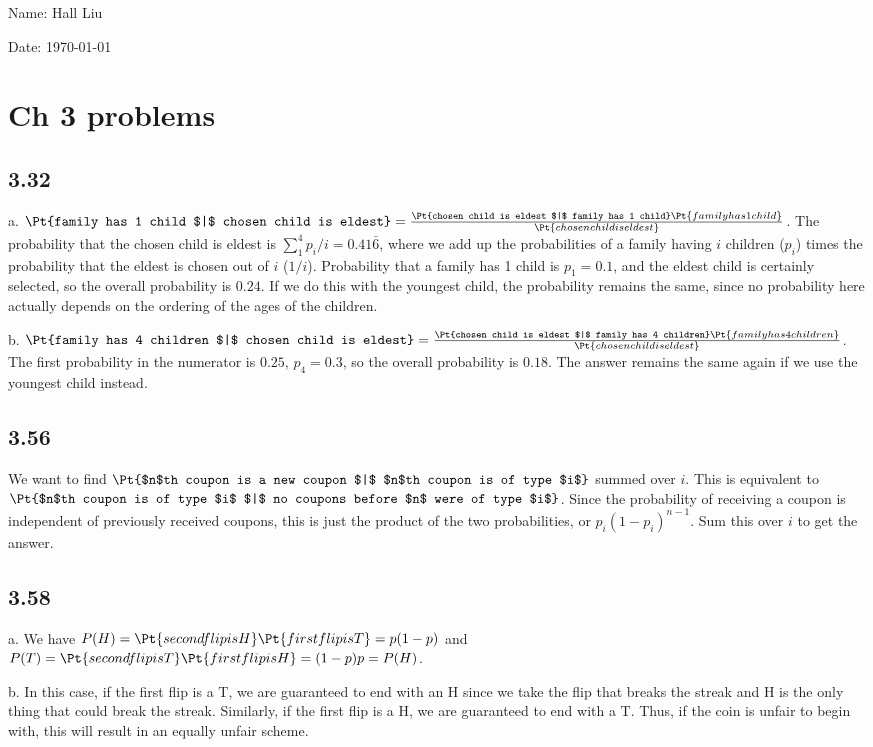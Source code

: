 \documentclass{article}
\begin{document}
Name: Hall Liu

Date: \today 
\vspace{1.5cm}
\section*{Ch 3 problems}
\subsection*{3.32}
a. $\Pt{family has 1 child $|$ chosen child is eldest} = \frac{\Pt{chosen child is eldest $|$ family has 1 child}\Pt{family has 1 child}}{\Pt{chosen child is eldest}}$. The probability that the chosen child is eldest is $\sum_1^4 p_i/i=0.41\bar{6}$, where we add up the probabilities of a family having $i$ children ($p_i$) times the probability that the eldest is chosen out of $i$ ($1/i$). Probability that a family has 1 child is $p_1=0.1$, and the eldest child is certainly selected, so the overall probability is $0.24$. If we do this with the youngest child, the probability remains the same, since no probability here actually depends on the ordering of the ages of the children.

b. $\Pt{family has 4 children $|$ chosen child is eldest} = \frac{\Pt{chosen child is eldest $|$ family has 4 children}\Pt{family has 4 children}}{\Pt{chosen child is eldest}}$. The first probability in the numerator is $0.25$, $p_4=0.3$, so the overall probability is $0.18$. The answer remains the same again if we use the youngest child instead.
\subsection*{3.56}
We want to find $\Pt{$n$th coupon is a new coupon $|$ $n$th coupon is of type $i$}$ summed over $i$. This is equivalent to \\
$\Pt{$n$th coupon is of type $i$ $|$ no coupons before $n$ were of type $i$}$. Since the probability of receiving a coupon is independent of previously received coupons, this is just the product of the two probabilities, or $p_i(1-p_i)^{n-1}$. Sum this over $i$ to get the answer.
\subsection*{3.58}
a. We have $P(H)=\Pt{second flip is H}\Pt{first flip is T}=p(1-p)$ and $P(T)=\Pt{second flip is T}\Pt{first flip is H}=(1-p)p=P(H)$.

b. In this case, if the first flip is a T, we are guaranteed to end with an H since we take the flip that breaks the streak and H is the only thing that could break the streak. Similarly, if the first flip is a H, we are guaranteed to end with a T. Thus, if the coin is unfair to begin with, this will result in an equally unfair scheme.
\end{document}
